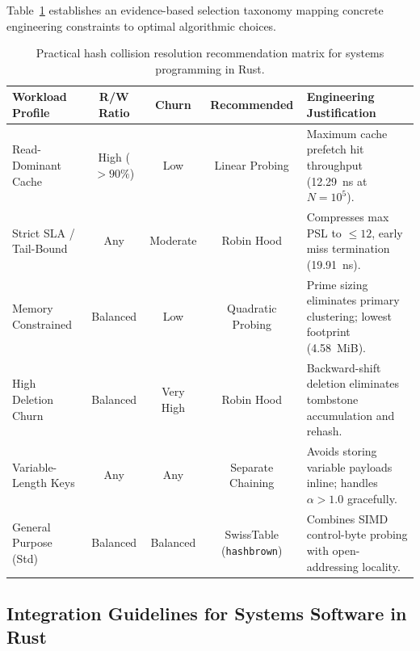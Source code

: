 \documentclass[conference]{IEEEtran}
\begin{document}
Table~\ref{tbl:selection_matrix} establishes an evidence-based selection taxonomy mapping concrete engineering constraints to optimal algorithmic choices.

\begin{table}[t]
\centering
\caption{Practical hash collision resolution recommendation matrix for systems programming in Rust.}
\label{tbl:selection_matrix}
\begin{tabular}{lcccl}
\toprule
\textbf{Workload Profile} & \textbf{R/W Ratio} & \textbf{Churn} & \textbf{Recommended} & \textbf{Engineering Justification} \\
\midrule
Read-Dominant Cache & High ($> 90\%$) & Low & Linear Probing & Maximum cache prefetch hit throughput (12.29~ns at $N=10^5$). \\
Strict SLA / Tail-Bound & Any & Moderate & Robin Hood & Compresses max PSL to $\le 12$, early miss termination (19.91~ns). \\
Memory Constrained & Balanced & Low & Quadratic Probing & Prime sizing eliminates primary clustering; lowest footprint (4.58~MiB). \\
High Deletion Churn & Balanced & Very High & Robin Hood & Backward-shift deletion eliminates tombstone accumulation and rehash. \\
Variable-Length Keys & Any & Any & Separate Chaining & Avoids storing variable payloads inline; handles $\alpha > 1.0$ gracefully. \\
General Purpose (Std) & Balanced & Balanced & SwissTable (\texttt{hashbrown}) & Combines SIMD control-byte probing with open-addressing locality. \\
\bottomrule
\end{tabular}
\end{table}

\subsection{Integration Guidelines for Systems Software in Rust}
\end{document}
